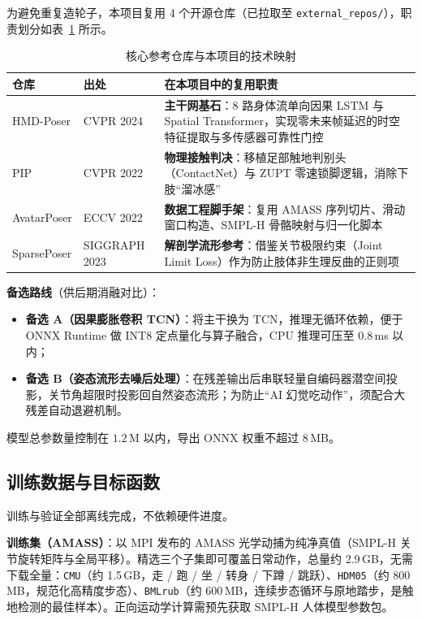 \documentclass[scheme=plain,UTF8,11pt,a4paper]{ctexart}
\begin{document}
为避免重复造轮子，本项目复用 4 个开源仓库（已拉取至 \texttt{external\_repos/}），职责划分如表~\ref{tab:repos} 所示。

\begin{table}[H]
\centering
\small
\caption{核心参考仓库与本项目的技术映射}
\label{tab:repos}
\begin{tabular}{p{2.6cm}p{2.4cm}p{8.4cm}}
\toprule
\textbf{仓库} & \textbf{出处} & \textbf{在本项目中的复用职责} \\
\midrule
HMD-Poser     & CVPR 2024   & \textbf{主干网基石}：8 路身体流单向因果 LSTM 与 Spatial Transformer，实现零未来帧延迟的时空特征提取与多传感器可靠性门控 \\
PIP           & CVPR 2022   & \textbf{物理接触判决}：移植足部触地判别头（ContactNet）与 ZUPT 零速锁脚逻辑，消除下肢“溜冰感” \\
AvatarPoser   & ECCV 2022   & \textbf{数据工程脚手架}：复用 AMASS 序列切片、滑动窗口构造、SMPL-H 骨骼映射与归一化脚本 \\
SparsePoser   & SIGGRAPH 2023 & \textbf{解剖学流形参考}：借鉴关节极限约束（Joint Limit Loss）作为防止肢体非生理反曲的正则项 \\
\bottomrule
\end{tabular}
\end{table}

\textbf{备选路线}（供后期消融对比）：
\begin{itemize}
    \item \textbf{备选 A（因果膨胀卷积 TCN）}：将主干换为 TCN，推理无循环依赖，便于 ONNX Runtime 做 INT8 定点量化与算子融合，CPU 推理可压至 $0.8$\,ms 以内；
    \item \textbf{备选 B（姿态流形去噪后处理）}：在残差输出后串联轻量自编码器潜空间投影，关节角超限时投影回自然姿态流形；为防止“AI 幻觉吃动作”，须配合大残差自动退避机制。
\end{itemize}

模型总参数量控制在 $1.2$\,M 以内，导出 ONNX 权重不超过 $8$\,MB。

\subsection{训练数据与目标函数}

训练与验证全部离线完成，不依赖硬件进度。

\textbf{训练集（AMASS）}：以 MPI 发布的 AMASS 光学动捕为纯净真值（SMPL-H 关节旋转矩阵与全局平移）。精选三个子集即可覆盖日常动作，总量约 2.9\,GB，无需下载全量：\texttt{CMU}（约 1.5\,GB，走 / 跑 / 坐 / 转身 / 下蹲 / 跳跃）、\texttt{HDM05}（约 800\,MB，规范化高精度步态）、\texttt{BMLrub}（约 600\,MB，连续步态循环与原地踏步，是触地检测的最佳样本）。正向运动学计算需预先获取 SMPL-H 人体模型参数包。
\end{document}
